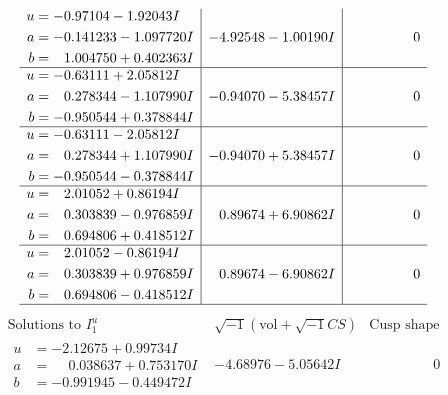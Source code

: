 \documentclass[1p]{elsarticle_modified}
\theoremstyle{definition}
\newcommand{\I}{\sqrt{-1}}
\begin{document}
$$\begin{array}{c|c|c}
\begin{aligned}
u &= -0.97104 - 1.92043 I \\
a &= -0.141233 - 1.097720 I \\
b &= \phantom{-}1.004750 + 0.402363 I\end{aligned}
 & -4.92548 - 1.00190 I & \phantom{-0.000000 } 0 \\ \hline\begin{aligned}
u &= -0.63111 + 2.05812 I \\
a &= \phantom{-}0.278344 - 1.107990 I \\
b &= -0.950544 + 0.378844 I\end{aligned}
 & -0.94070 - 5.38457 I & \phantom{-0.000000 } 0 \\ \hline\begin{aligned}
u &= -0.63111 - 2.05812 I \\
a &= \phantom{-}0.278344 + 1.107990 I \\
b &= -0.950544 - 0.378844 I\end{aligned}
 & -0.94070 + 5.38457 I & \phantom{-0.000000 } 0 \\ \hline\begin{aligned}
u &= \phantom{-}2.01052 + 0.86194 I \\
a &= \phantom{-}0.303839 - 0.976859 I \\
b &= \phantom{-}0.694806 + 0.418512 I\end{aligned}
 & \phantom{-}0.89674 + 6.90862 I & \phantom{-0.000000 } 0 \\ \hline\begin{aligned}
u &= \phantom{-}2.01052 - 0.86194 I \\
a &= \phantom{-}0.303839 + 0.976859 I \\
b &= \phantom{-}0.694806 - 0.418512 I\end{aligned}
 & \phantom{-}0.89674 - 6.90862 I & \phantom{-0.000000 } 0\\
 \hline 
 \end{array}$$\newpage$$\begin{array}{c|c|c}  
\text{Solutions to }I^u_{1}& \I (\text{vol} + \sqrt{-1}CS) & \text{Cusp shape}\\
 \hline 
\begin{aligned}
u &= -2.12675 + 0.99734 I \\
a &= \phantom{-}0.038637 + 0.753170 I \\
b &= -0.991945 - 0.449472 I\end{aligned}
 & -4.68976 - 5.05642 I & \phantom{-0.000000 } 0 \\ \hline\begin{aligned}

\end{aligned}
\end{array}$$
\end{document}
